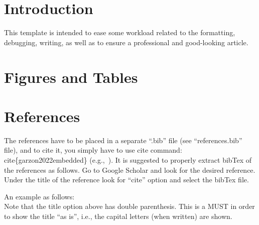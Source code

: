 \documentclass[conference]{IEEEtran}
\begin{document}
\section{Introduction}\label{introduction}
This template is intended to ease some workload related to the formatting, debugging, writing, as well as to ensure a professional and good-looking article. 


\section{Figures and Tables}


\section{References}
The references have to be placed in a separate ``.bib'' file (see ``references.bib'' file), and to cite it, you simply have to use cite command: \arraybackslash \\cite\{garzon2022embedded\} (e.g.,~\cite{garzon2021gain}).
It is suggested to properly extract bibTex of the references as follows.
Go to Google Scholar and look for the desired reference. 
Under the title of the reference look for ``cite'' option and select the bibTex file.

An example as follows:\\
    
Note that the title option above has double parenthesis. This is a MUST in order to show the title ``as is'', i.e., the capital letters (when written) are shown.
\end{document}
